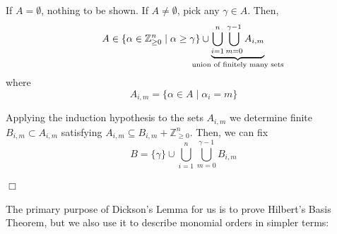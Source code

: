 \begin{theorem}[title = Dickson's Lemma]
\begin{minipage}{0.49\textwidth}
\begin{center}
    \end{center}
  \end{minipage}
  If $A = \emptyset$, nothing to be shown. If $A \neq \emptyset$, pick any $\gamma \in A$. Then, \[A \in \{\alpha \in \mathbb{Z}^n_{\geq 0} \mid \alpha \geq \gamma\} \cup \underbrace{\bigcup_{i =1}^{n} \bigcup_{m =0}^{\gamma -1}A_{i,m}}_{\mathclap{\text{union of finitely many sets}}}\]
  where
  \[A_{i,m} = \{\alpha \in A \mid \alpha_i = m\}\] 

  Applying the induction hypothesis to the sets $A_{i,m}$ we determine finite $B_{i,m} \subset A_{i,m}$ satisfying $A_{i,m} \subseteq B_{i,m} + \mathbb{Z}^n_{\geq 0}$. 
  Then, we can fix \[B = \{\gamma\} \cup \bigcup_{i =1}^{n} \bigcup_{m =0}^{\gamma -1}B_{i,m}\]  
    \begin{flushright}
      $\Box $
    \end{flushright}
\end{theorem}

The primary purpose of Dickson's Lemma for us is to prove Hilbert's Basis Theorem, but we also  use it to describe monomial orders in simpler terms: 

